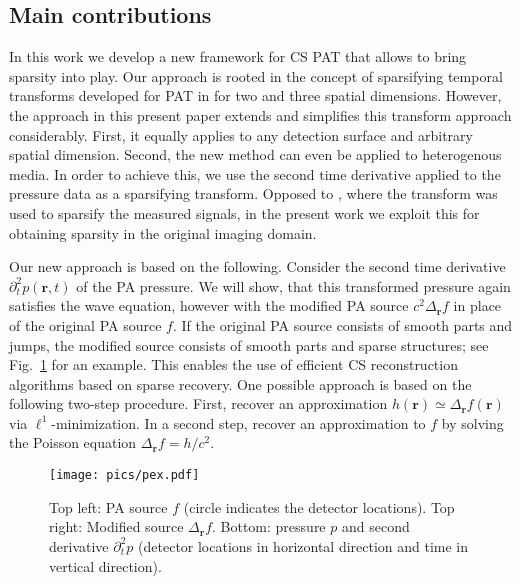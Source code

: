 \documentclass[11pt]{article}
\newcommand{\rr}{\mathbf r}
\newcommand{\source}{f}
\newcommand{\Lsource}{h}
\begin{document}
\subsection{Main contributions}
\label{ssec:outline}


In this work we develop a new  framework for CS PAT that allows to bring sparsity into play. Our approach is rooted in the concept of sparsifying  temporal transforms developed for PAT in \cite{sandbichler2015novel,haltmeier2016compressed}
for two and three  spatial dimensions. However, the approach
in this present paper extends and simplifies this transform approach considerably.
First, it equally applies to any  detection surface and  arbitrary spatial dimension.
Second,
the new method can even be applied  to heterogenous media.
In order to achieve this, we use the second time derivative applied to the pressure data as a sparsifying transform. Opposed to \cite{sandbichler2015novel,haltmeier2016compressed},  where the transform was used to sparsify the measured signals, in the present work we exploit this for
obtaining sparsity in the original imaging domain.


Our new approach  is based on the  following. Consider the  second time derivative
$\partial_t^2 p(\rr, t)$ of the  PA pressure. We will show, that this transformed pressure
again satisfies the wave equation,  however
with the modified  PA source
$c^2 \Delta_{\rr} \source$ in place of  the original
PA source $\source$.
If the original
PA source  consists of smooth parts  and jumps,
the modified source consists of smooth parts and sparse  structures;
see Fig.~\ref{fig:pex} for an example.
This enables the use of efficient CS reconstruction algorithms
based on sparse recovery.
One  possible  approach is based on the following two-step procedure. First, recover  an approximation
$\Lsource (\rr) \simeq \Delta_{\rr} \source (\rr) $ via $\ell^1$-minimization. In a second step, recover
an approximation  to $\source$ by solving the Poisson equation $\Delta_{\rr} \source  =    \Lsource/c^2 $.


\begin{psfrags}
	\begin{figure}[htb!]
		\begin{center}
			\texttt{[image: pics/pex.pdf]}
			\caption{\label{fig:pex} Top left: PA source $\source$ (circle indicates the detector locations). Top right:  Modified source $ \Delta_{\rr} \source$. Bottom:   pressure   $p$ and second derivative $\partial_t^2 p$ (detector locations in horizontal direction and time in vertical direction).}
		\end{center}
	\end{figure}
\end{psfrags}
\end{document}
